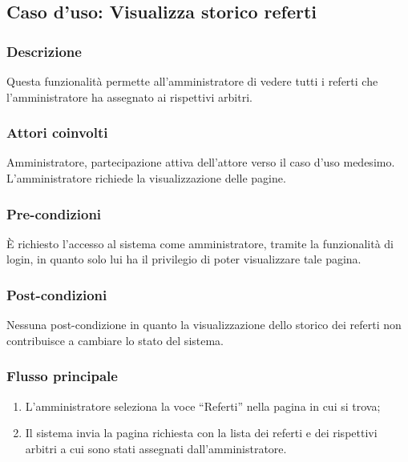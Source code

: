 \subsection{Caso d'uso: Visualizza storico referti}
\label{uc-visualizza-storico-referti}

\subsubsection*{Descrizione}
Questa funzionalità permette all'amministratore di vedere tutti i referti che l'amministratore ha assegnato ai rispettivi arbitri.

\subsubsection*{Attori coinvolti}
Amministratore, partecipazione attiva dell'attore verso il caso d'uso medesimo.
L'amministratore richiede la visualizzazione delle pagine.

\subsubsection*{Pre-condizioni}
È richiesto l'accesso al sistema come amministratore, tramite la funzionalità di login, in quanto solo lui ha il privilegio di poter visualizzare tale pagina.

\subsubsection*{Post-condizioni}
Nessuna post-condizione in quanto la visualizzazione dello storico dei referti non contribuisce a cambiare lo stato del sistema.

\subsubsection*{Flusso principale}

\begin{enumerate}
	
	\item
	L'amministratore seleziona la voce ``Referti'' nella pagina in cui si trova;
	
	\item
	Il sistema invia la pagina richiesta con la lista dei referti e dei rispettivi arbitri a cui sono stati assegnati dall'amministratore.
	
\end{enumerate}

